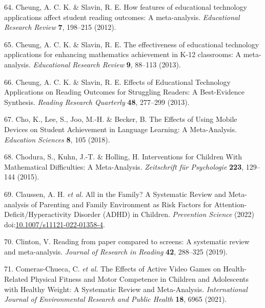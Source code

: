 \documentclass[
  english,
  man]{apa6}
\newenvironment{cslreferences}%
  {}%
  {\par}
\begin{document}
\begin{cslreferences}
\leavevmode\hypertarget{ref-cheungHowFeaturesEducational2012}{}%
64. Cheung, A. C. K. \& Slavin, R. E. How features of educational technology applications affect student reading outcomes: A meta-analysis. \emph{Educational Research Review} \textbf{7}, 198--215 (2012).

\leavevmode\hypertarget{ref-cheungEffectivenessEducationalTechnology2013}{}%
65. Cheung, A. C. K. \& Slavin, R. E. The effectiveness of educational technology applications for enhancing mathematics achievement in K-12 classrooms: A meta-analysis. \emph{Educational Research Review} \textbf{9}, 88--113 (2013).

\leavevmode\hypertarget{ref-cheungEffectsEducationalTechnology2013}{}%
66. Cheung, A. C. K. \& Slavin, R. E. Effects of Educational Technology Applications on Reading Outcomes for Struggling Readers: A Best-Evidence Synthesis. \emph{Reading Research Quarterly} \textbf{48}, 277--299 (2013).

\leavevmode\hypertarget{ref-choEffectsUsingMobile2018}{}%
67. Cho, K., Lee, S., Joo, M.-H. \& Becker, B. The Effects of Using Mobile Devices on Student Achievement in Language Learning: A Meta-Analysis. \emph{Education Sciences} \textbf{8}, 105 (2018).

\leavevmode\hypertarget{ref-choduraInterventionsChildrenMathematical2015}{}%
68. Chodura, S., Kuhn, J.-T. \& Holling, H. Interventions for Children With Mathematical Difficulties: A Meta-Analysis. \emph{Zeitschrift für Psychologie} \textbf{223}, 129--144 (2015).

\leavevmode\hypertarget{ref-claussenAllFamilySystematic2022}{}%
69. Claussen, A. H. \emph{et al.} All in the Family? A Systematic Review and Meta-analysis of Parenting and Family Environment as Risk Factors for Attention-Deficit/Hyperactivity Disorder (ADHD) in Children. \emph{Prevention Science} (2022) doi:\href{https://doi.org/10.1007/s11121-022-01358-4}{10.1007/s11121-022-01358-4}.

\leavevmode\hypertarget{ref-clintonReadingPaperCompared2019}{}%
70. Clinton, V. Reading from paper compared to screens: A systematic review and meta-analysis. \emph{Journal of Research in Reading} \textbf{42}, 288--325 (2019).

\leavevmode\hypertarget{ref-comeras-chuecaEffectsActiveVideo2021}{}%
71. Comeras-Chueca, C. \emph{et al.} The Effects of Active Video Games on Health-Related Physical Fitness and Motor Competence in Children and Adolescents with Healthy Weight: A Systematic Review and Meta-Analysis. \emph{International Journal of Environmental Research and Public Health} \textbf{18}, 6965 (2021).


\end{cslreferences}
\end{document}
